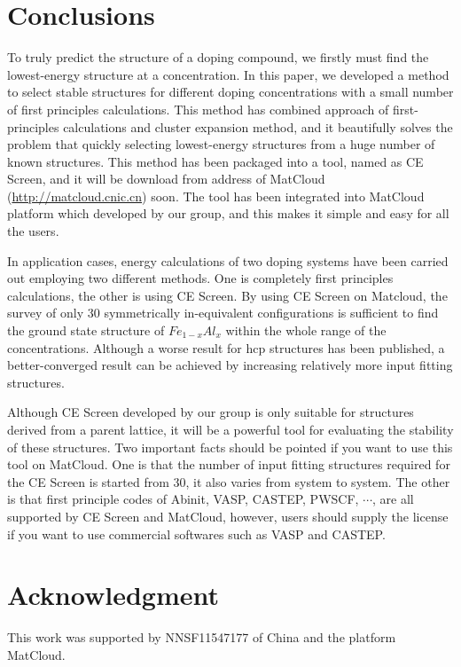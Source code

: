 \documentclass[aps,preprint,amsmath,amssymb]{revtex4}
\begin{document}
\section{Conclusions}
To truly predict the structure of a doping compound, we firstly must find the lowest-energy structure at a concentration.
In this paper, we developed a method to select stable structures for different doping concentrations
with a small number of first principles calculations.
This method has combined approach of first-principles calculations and cluster expansion method, and it
beautifully solves the problem that quickly selecting lowest-energy structures from a huge number of known structures.
This method has been packaged into a tool, named as CE Screen, and it will be download from address of MatCloud (\url{http://matcloud.cnic.cn}) soon.
The tool has been integrated into MatCloud platform which developed by our group, and this makes it simple and easy for all the users.

In application cases, energy calculations of two doping systems have been carried out employing two different methods.
One is completely first principles calculations, the other is using CE Screen.
By using CE Screen on Matcloud, the survey of only 30 symmetrically in-equivalent configurations is sufficient
to find the ground state structure of $Fe_{1-x}Al_{x}$ within the whole range of the concentrations.
Although a worse result for hcp structures has been published, a better-converged result can be achieved
by increasing relatively more input fitting structures.

Although CE Screen developed by our group is only suitable for structures derived from a parent lattice,
it will be a powerful tool for evaluating the stability of these structures.
Two important facts should be pointed if you want to use this tool on MatCloud.
One is that the number of input fitting structures required for the
CE Screen is started from 30, it also varies from system to system.
The other is that first principle codes of Abinit, VASP, CASTEP, PWSCF, $\cdots$, are all supported by CE Screen and
MatCloud, however, users should supply the license if you want to use commercial softwares such as VASP and CASTEP.
\section*{Acknowledgment}
This work was supported by NNSF11547177 of China and the platform MatCloud.


\end{document}
